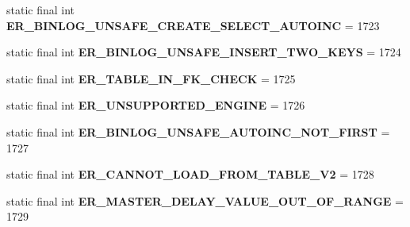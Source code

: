 \begin{DoxyCompactItemize}
static final int {\bfseries E\+R\+\_\+\+B\+I\+N\+L\+O\+G\+\_\+\+U\+N\+S\+A\+F\+E\+\_\+\+C\+R\+E\+A\+T\+E\+\_\+\+S\+E\+L\+E\+C\+T\+\_\+\+A\+U\+T\+O\+I\+NC} = 1723
\item 
\mbox{\label{classcom_1_1mysql_1_1jdbc_1_1_mysql_error_numbers_af9e06b0914de4d34cc36620213b93008}} 
static final int {\bfseries E\+R\+\_\+\+B\+I\+N\+L\+O\+G\+\_\+\+U\+N\+S\+A\+F\+E\+\_\+\+I\+N\+S\+E\+R\+T\+\_\+\+T\+W\+O\+\_\+\+K\+E\+YS} = 1724
\item 
\mbox{\label{classcom_1_1mysql_1_1jdbc_1_1_mysql_error_numbers_a20756cfe5db765e3637b4ce42d940a49}} 
static final int {\bfseries E\+R\+\_\+\+T\+A\+B\+L\+E\+\_\+\+I\+N\+\_\+\+F\+K\+\_\+\+C\+H\+E\+CK} = 1725
\item 
\mbox{\label{classcom_1_1mysql_1_1jdbc_1_1_mysql_error_numbers_a86814b7bd14ba631b96b637127f22a6e}} 
static final int {\bfseries E\+R\+\_\+\+U\+N\+S\+U\+P\+P\+O\+R\+T\+E\+D\+\_\+\+E\+N\+G\+I\+NE} = 1726
\item 
\mbox{\label{classcom_1_1mysql_1_1jdbc_1_1_mysql_error_numbers_a353e3994b5f1fa1818e1ecc98e175dd1}} 
static final int {\bfseries E\+R\+\_\+\+B\+I\+N\+L\+O\+G\+\_\+\+U\+N\+S\+A\+F\+E\+\_\+\+A\+U\+T\+O\+I\+N\+C\+\_\+\+N\+O\+T\+\_\+\+F\+I\+R\+ST} = 1727
\item 
\mbox{\label{classcom_1_1mysql_1_1jdbc_1_1_mysql_error_numbers_a20e3664cb0030541855147499d368c41}} 
static final int {\bfseries E\+R\+\_\+\+C\+A\+N\+N\+O\+T\+\_\+\+L\+O\+A\+D\+\_\+\+F\+R\+O\+M\+\_\+\+T\+A\+B\+L\+E\+\_\+\+V2} = 1728
\item 
\mbox{\label{classcom_1_1mysql_1_1jdbc_1_1_mysql_error_numbers_a63e0c4a2b99ef2c145bd21c8868ef0ab}} 
static final int {\bfseries E\+R\+\_\+\+M\+A\+S\+T\+E\+R\+\_\+\+D\+E\+L\+A\+Y\+\_\+\+V\+A\+L\+U\+E\+\_\+\+O\+U\+T\+\_\+\+O\+F\+\_\+\+R\+A\+N\+GE} = 1729
\item 
\mbox{\label{classcom_1_1mysql_1_1jdbc_1_1_mysql_error_numbers_ac8ec041d5387f7842018b40a32b29e64}} 

\end{DoxyCompactItemize}
